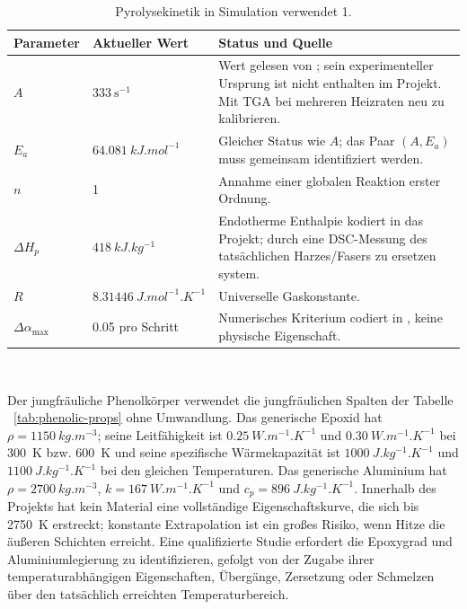\documentclass[oneside,openany]{amsdtx}
\begin{document}
\begin{table}[H]
\centering
\small
\renewcommand{\arraystretch}{1.15}
\begin{tabular}{L{0.22\textwidth}M{0.20\textwidth}L{0.47\textwidth}}
\toprule
\textbf{Parameter} & \textbf{ Aktueller Wert} & \textbf{Status und Quelle} \\
\midrule
\(A\) & \(333\ \mathrm{s^{-1}}\) & Wert gelesen von
; sein experimenteller Ursprung ist nicht enthalten
im Projekt. Mit TGA bei mehreren Heizraten neu zu kalibrieren. \\
\(E_a\) & \(\SI{64.081}{kJ.mol^{-1}}\) & Gleicher Status wie \(A\); das Paar
\((A,E_a)\) muss gemeinsam identifiziert werden. \\
\(n\) & 1 & Annahme einer globalen Reaktion erster Ordnung. \\
\(\Delta H_p\) & \(\SI{418}{kJ.kg^{-1}}\) & Endotherme Enthalpie kodiert in
das Projekt; durch eine DSC-Messung des tatsächlichen Harzes/Fasers zu ersetzen
system. \\
\(R\) & \(\SI{8.31446}{J.mol^{-1}.K^{-1}}\) & Universelle Gaskonstante. \\
\(\Delta\alpha_\mathrm{max}\) & 0.05 pro Schritt & Numerisches Kriterium
codiert in , keine physische Eigenschaft. \\
\bottomrule
\end{tabular}~\\[1em]
\caption{Pyrolysekinetik in Simulation verwendet 1.}
\label{tab:kinetics}
\end{table}

Der jungfräuliche Phenolkörper  verwendet die jungfräulichen Spalten der Tabelle ~\ref{tab:phenolic-props} ohne Umwandlung. Das generische Epoxid hat \(\rho=\SI{1150}{kg.m^{-3}}\); seine Leitfähigkeit ist \(\SI{0.25}{W.m^{-1}.K^{-1}}\) und \(\SI{0.30}{W.m^{-1}.K^{-1}}\) bei \SI{300}{K} bzw. \SI{600}{K} und seine spezifische Wärmekapazität ist \(\SI{1000}{J.kg^{-1}.K^{-1}}\) und \(\SI{1100}{J.kg^{-1}.K^{-1}}\) bei den gleichen Temperaturen. Das generische Aluminium hat \(\rho=\SI{2700}{kg.m^{-3}}\), \(k=\SI{167}{W.m^{-1}.K^{-1}}\) und \(c_p=\SI{896}{J.kg^{-1}.K^{-1}}\). Innerhalb des Projekts hat kein Material eine vollständige Eigenschaftskurve, die sich bis \SI{2750}{K} erstreckt; konstante Extrapolation ist ein großes Risiko, wenn Hitze die äußeren Schichten erreicht. Eine qualifizierte Studie erfordert die Epoxygrad und Aluminiumlegierung zu identifizieren, gefolgt von der Zugabe ihrer temperaturabhängigen Eigenschaften, Übergänge, Zersetzung oder Schmelzen über den tatsächlich erreichten Temperaturbereich.
\end{document}
